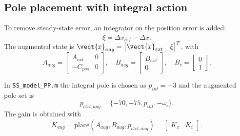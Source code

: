 \subsection{Pole placement with integral action}

To remove steady-state error, an integrator on the position error is added:
\begin{equation}
    \dot{\xi} = \Delta x_{ref} - \Delta x.
\end{equation}
The augmented state is $\vect{x}_{aug} = \begin{bmatrix} \vect{x}_{ext} & \xi \end{bmatrix}^T$, with
\begin{equation}
    A_{aug} =
    \begin{bmatrix}
        A_{ext} & 0 \\
        -C_{pos} & 0
    \end{bmatrix},
    \quad
    B_{aug} =
    \begin{bmatrix}
        B_{ext} \\
        0
    \end{bmatrix},
    \quad
    B_{r} =
    \begin{bmatrix}
        0 \\
        1
    \end{bmatrix}.
\end{equation}

In \texttt{SS\_model\_PP.m} the integral pole is chosen as $p_{int} = -3$ and the augmented pole set is
\begin{equation}
    p_{ctrl,aug} = \{-70, -75, p_{int}, -\omega_i\}.
\end{equation}
The gain is obtained with
\begin{equation}
    K_{aug} = \mathrm{place}(A_{aug}, B_{aug}, p_{ctrl,aug}) = \begin{bmatrix} K_x & K_i \end{bmatrix}.
\end{equation}
